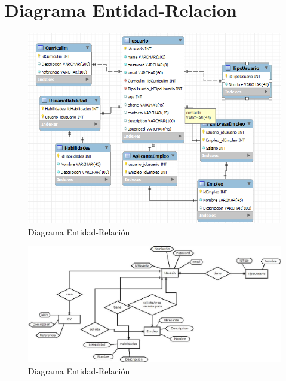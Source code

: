 \newpage
\section{Diagrama Entidad-Relacion}

\begin{figure}[h]
\begin{center}
	\includegraphics[scale=1]{./resources/eer.png}
	\caption{Diagrama Entidad-Relación}
	\label{fig:err1}
\end{center}
\end{figure}

\begin{figure}[h]
\begin{center}
	\includegraphics[scale=0.65]{./resources/eer.jpg}
	\caption{Diagrama Entidad-Relación}
	\label{fig:err2}
\end{center}
\end{figure}


